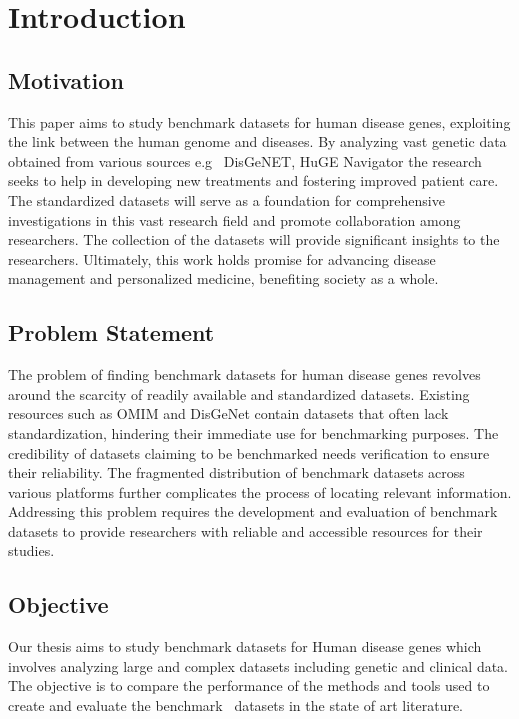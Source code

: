 \chapter{Introduction}
\label{chap:intro}

\section{Motivation}

This paper aims to study benchmark datasets for human disease genes, exploiting the link between the human genome and diseases. By analyzing vast genetic data obtained from various sources e.g  DisGeNET, HuGE Navigator the research seeks to help in developing new treatments and fostering improved patient care. The standardized datasets will serve as a foundation for comprehensive investigations in this vast research field and promote collaboration among researchers. The collection of the datasets will provide significant insights to the researchers. Ultimately, this work holds promise for advancing disease management and personalized medicine, benefiting society as a whole.

\section{Problem Statement}

The problem of finding benchmark datasets for human disease genes revolves around the scarcity of readily available and standardized datasets. Existing resources such as OMIM and DisGeNet contain datasets that often lack standardization, hindering their immediate use for benchmarking purposes. The credibility of datasets claiming to be benchmarked needs verification to ensure their reliability. The fragmented distribution of benchmark datasets across various platforms further complicates the process of locating relevant information. Addressing this problem requires the development and evaluation of benchmark datasets to provide researchers with reliable and accessible resources for their studies. 

\section{Objective}

Our thesis aims to study benchmark datasets for Human disease genes which involves analyzing large and complex datasets including genetic and clinical data. The objective is to compare the performance of the methods and tools used to create and evaluate the benchmark  datasets in the state of art literature. 

